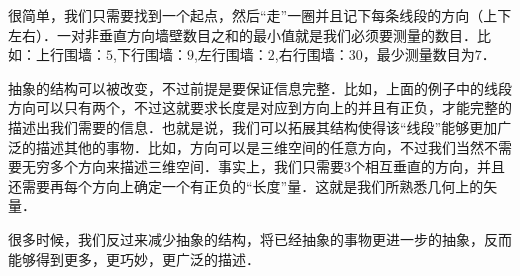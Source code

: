 很简单，我们只需要找到一个起点，然后“走”一圈并且记下每条线段的方向（上下左右）．一对非垂直方向墙壁数目之和的最小值就是我们必须要测量的数目．比如：上行围墙：$5$,下行围墙：$9$,左行围墙：$2$,右行围墙：$30$，最少测量数目为$7$．

抽象的结构可以被改变，不过前提是要保证信息完整．比如，上面的例子中的线段方向可以只有两个，不过这就要求长度是对应到方向上的并且有正负，才能完整的描述出我们需要的信息．也就是说，我们可以拓展其结构使得该“线段”能够更加广泛的描述其他的事物．比如，方向可以是三维空间的任意方向，不过我们当然不需要无穷多个方向来描述三维空间．事实上，我们只需要$3$个相互垂直的方向，并且还需要再每个方向上确定一个有正负的“长度”量．这就是我们所熟悉几何上的矢量．

很多时候，我们反过来减少抽象的结构，将已经抽象的事物更进一步的抽象，反而能够得到更多，更巧妙，更广泛的描述．
